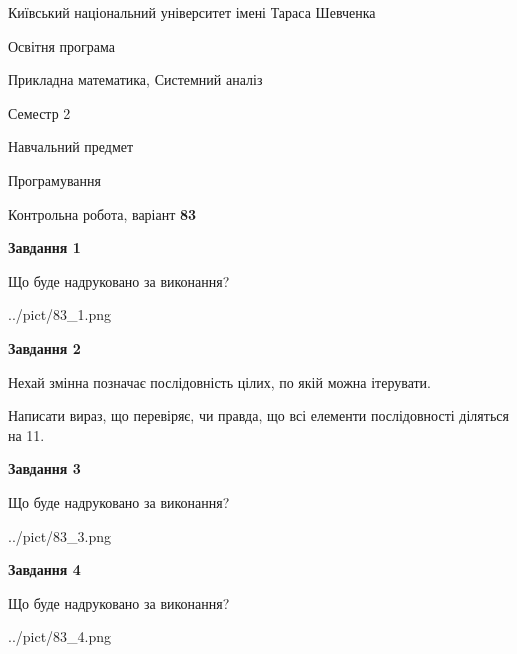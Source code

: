\documentclass[12pt, ukrainian]{article}
\begin{document}
{{\begin {small}\par
{ \center  Київський національний університет імені Тараса Шевченка \par}
{\parbox {5 cm}{Освітня програма \hfill}{\parbox {8 cm}{Прикладна математика, Системний аналіз \hfill}}\parbox {5 cm}{\hfill Семестр 2}}\par
{\parbox {5 cm} {Навчальний предмет \hfill}\parbox {7 cm}{Програмування \hfill}\parbox {6cm}{\hfill}\par}\vspace{-7pt} \end{small}}{\center Контрольна робота, варіант  \No \textbf
{ 83 }\par}}
{
\begin {large}
{\begin {center}\textbf{Завдання 1}\end {center}}\par
Що буде надруковано за виконання?\par\par
\begin{center}
	{../pict/83_1.png}
\end{center}
\newpage

{\begin {center}\textbf{Завдання 2}\end {center}}\par
Нехай змінна  позначає послідовність цілих, по якій можна ітерувати.

Написати вираз, що перевіряє, чи правда, що всі елементи послідовності діляться на 11.\par
\newpage

{\begin {center}\textbf{Завдання 3}\end {center}}\par
Що буде надруковано за виконання?\par
\begin{center}
	{../pict/83_3.png}
\end{center}
\newpage

{\begin {center}\textbf{Завдання 4}\end {center}}\par
Що буде надруковано за виконання?\par
\begin{center}
	{../pict/83_4.png}
\end{center}
\newpage


\end{large}}
\end{document}
